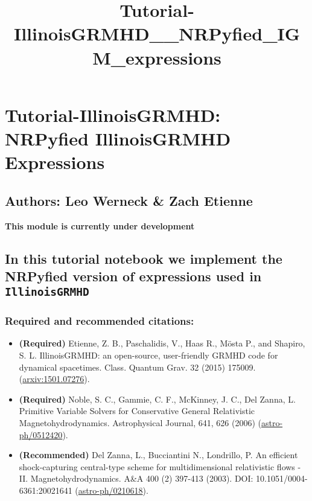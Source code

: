 \documentclass[landscape,letterpaper,10pt,english]{article}
\title{Tutorial-IllinoisGRMHD\_\_NRPyfied\_IGM\_expressions}
\providecommand{\tightlist}{%
      \setlength{\itemsep}{0pt}\setlength{\parskip}{0pt}}
\begin{document}
    
    \maketitle
    
    

    
    \section{Tutorial-IllinoisGRMHD: NRPyfied IllinoisGRMHD
Expressions}\label{tutorial-illinoisgrmhd-nrpyfied-illinoisgrmhd-expressions}

\subsection{Authors: Leo Werneck \& Zach
Etienne}\label{authors-leo-werneck-zach-etienne}

\textbf{This module is currently under development}

\subsection{\texorpdfstring{In this tutorial notebook we implement the
NRPyfied version of expressions used in
\texttt{IllinoisGRMHD}}{In this tutorial notebook we implement the NRPyfied version of expressions used in IllinoisGRMHD}}\label{in-this-tutorial-notebook-we-implement-the-nrpyfied-version-of-expressions-used-in-illinoisgrmhd}

\subsubsection{Required and recommended
citations:}\label{required-and-recommended-citations}

\begin{itemize}
\tightlist
\item
  \textbf{(Required)} Etienne, Z. B., Paschalidis, V., Haas R., Mösta
  P., and Shapiro, S. L. IllinoisGRMHD: an open-source, user-friendly
  GRMHD code for dynamical spacetimes. Class. Quantum Grav. 32 (2015)
  175009. (\href{http://arxiv.org/abs/1501.07276}{arxiv:1501.07276}).
\item
  \textbf{(Required)} Noble, S. C., Gammie, C. F., McKinney, J. C., Del
  Zanna, L. Primitive Variable Solvers for Conservative General
  Relativistic Magnetohydrodynamics. Astrophysical Journal, 641, 626
  (2006)
  (\href{https://arxiv.org/abs/astro-ph/0512420}{astro-ph/0512420}).
\item
  \textbf{(Recommended)} Del Zanna, L., Bucciantini N., Londrillo, P. An
  efficient shock-capturing central-type scheme for multidimensional
  relativistic flows - II. Magnetohydrodynamics. A\&A 400 (2) 397-413
  (2003). DOI: 10.1051/0004-6361:20021641
  (\href{https://arxiv.org/abs/astro-ph/0210618}{astro-ph/0210618}).
\end{itemize}
\end{document}
